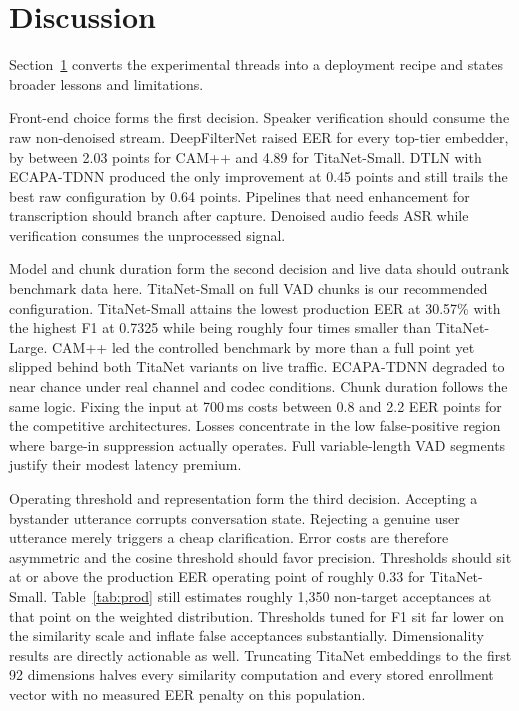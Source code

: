 \documentclass{llncs}
\begin{document}
\section{Discussion}\label{sec:discussion}
Section~\ref{sec:discussion} converts the experimental threads into a deployment recipe and states broader lessons and limitations.

Front-end choice forms the first decision. Speaker verification should consume the raw non-denoised stream. DeepFilterNet raised EER for every top-tier embedder, by between 2.03 points for CAM++ and 4.89 for TitaNet-Small. DTLN with ECAPA-TDNN produced the only improvement at 0.45 points and still trails the best raw configuration by 0.64 points. Pipelines that need enhancement for transcription should branch after capture. Denoised audio feeds ASR while verification consumes the unprocessed signal.

Model and chunk duration form the second decision and live data should outrank benchmark data here. TitaNet-Small on full VAD chunks is our recommended configuration. TitaNet-Small attains the lowest production EER at 30.57\% with the highest F1 at 0.7325 while being roughly four times smaller than TitaNet-Large. CAM++ led the controlled benchmark by more than a full point yet slipped behind both TitaNet variants on live traffic. ECAPA-TDNN degraded to near chance under real channel and codec conditions. Chunk duration follows the same logic. Fixing the input at 700\,ms costs between 0.8 and 2.2 EER points for the competitive architectures. Losses concentrate in the low false-positive region where barge-in suppression actually operates. Full variable-length VAD segments justify their modest latency premium.

Operating threshold and representation form the third decision. Accepting a bystander utterance corrupts conversation state. Rejecting a genuine user utterance merely triggers a cheap clarification. Error costs are therefore asymmetric and the cosine threshold should favor precision. Thresholds should sit at or above the production EER operating point of roughly 0.33 for TitaNet-Small. Table~\ref{tab:prod} still estimates roughly 1{,}350 non-target acceptances at that point on the weighted distribution. Thresholds tuned for F1 sit far lower on the similarity scale and inflate false acceptances substantially. Dimensionality results are directly actionable as well. Truncating TitaNet embeddings to the first 92 dimensions halves every similarity computation and every stored enrollment vector with no measured EER penalty on this population.
\end{document}
